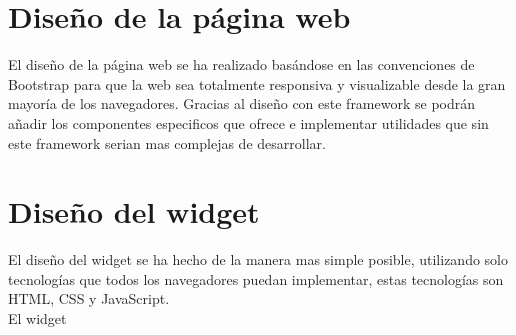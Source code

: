 \section{Diseño de la página web}
El diseño de la página web se ha realizado basándose en las convenciones de Bootstrap para que la web sea totalmente responsiva y visualizable desde la gran mayoría de los navegadores. Gracias al diseño con este framework se podrán añadir los componentes especificos que ofrece e implementar utilidades que sin este framework serian mas complejas de desarrollar.\\



\section{Diseño del widget}
El diseño del widget se ha hecho de la manera mas simple posible, utilizando solo tecnologías que todos los navegadores puedan implementar, estas tecnologías son HTML, CSS y JavaScript.\\

El widget 


